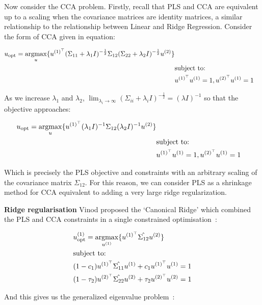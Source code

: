 Now consider the CCA problem.
Firstly, recall that PLS and CCA are equivalent up to a scaling when the covariance matrices are identity matrices, a similar relationship to the relationship between Linear and Ridge Regression.
Consider the form of CCA given in equation:

\begin{align}\label
     & u_{\text{opt}}=\underset{u}{\mathrm{argmax}}\{ u\spstop{1}(\Sigma_{11}+ \lambda_1 I)^{-\frac{1}{2}}\Sigma_{12}(\Sigma_{22}+\lambda_2 I)^{-\frac{1}{2}}u\sps{2} \} \\
     & \text{subject to:} \notag \\
     & u\spstop{1}u\sps{1}=1, u\spstop{2}u\sps{1}=1 \notag
\end{align}

As we increase $\lambda_1$ and $\lambda_2$, $\lim_{\lambda_i \to \infty} (\Sigma_{ii}+ \lambda_i I)^{-\frac{1}{2}}= (\lambda I)^{-1}$ so that the objective approaches:

\begin{align}\label
     & u_{\text{opt}}=\underset{u}{\mathrm{argmax}}\{ u\spstop{1}(\lambda_1 I)^{-1}\Sigma_{12}(\lambda_2 I)^{-1}u\sps{2} \} \\
        & \text{subject to:} \notag \\
        & u\spstop{1}u\sps{1}=1, u\spstop{2}u\sps{1}=1 \notag
\end{align}

Which is precisely the PLS objective and constraints with an arbitrary scaling of the covariance matrix $\Sigma_{12}$.
For this reason, we can consider PLS as a shrinkage method for CCA equivalent to adding a very large ridge regularization.

\textbf{Ridge regularisation} Vinod proposed the `Canonical Ridge' which combined the PLS and CCA constraints in a single constrained optimisation~\cite{vinod1976canonical}:

\begin{align}
     & u^{(1)}_{\text{opt}} = \underset{u^{(1)}}{\mathrm{argmax}} \{ u^{(1)^{\top}} \hat{\Sigma_{12}} u^{(2)} \} \\
     & \text{subject to:} \notag \\
     & (1 - c_1) u^{(1)^{\top}} \hat{\Sigma_{11}} u^{(1)} + c_1 u^{(1)^{\top}} u^{(1)} = 1 \notag \\
     & (1 - \tau_2) u^{(2)^{\top}} \hat{\Sigma_{22}} u^{(2)} + \tau_2 u^{(2)^{\top}} u^{(2)} = 1 \notag
\end{align}

And this gives us the generalized eigenvalue problem~\cite{rosipal2005overview}:

